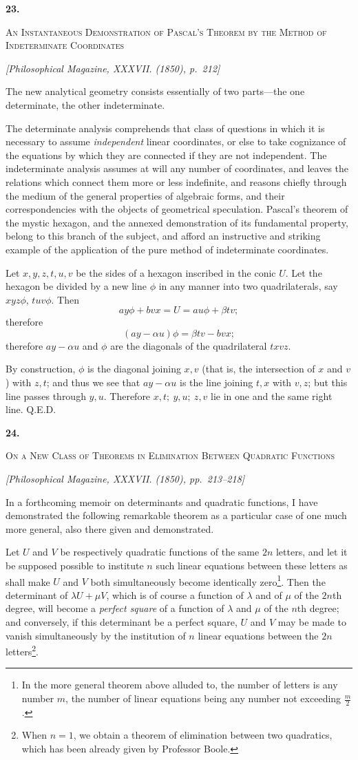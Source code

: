 \documentclass[11pt]{article}
\newcommand{\paperhead}[3]{%
  \clearpage
  \begin{center}
  {\Large\bfseries #1.}\par\vspace{0.85em}
  {\large\scshape #2}\par\vspace{0.6em}
  {\itshape [#3]}\par
  \end{center}\vspace{0.4em}}
\newcommand{\sourcepage}[1]{\marginpar{\scriptsize p.~#1}}
\begin{document}
{{\paperhead{23}{An Instantaneous Demonstration of Pascal's Theorem by the Method of Indeterminate Coordinates}{Philosophical Magazine, XXXVII. (1850), p.~212}

\sourcepage{138}
The new analytical geometry consists essentially of two parts---the one determinate, the other indeterminate.

The determinate analysis comprehends that class of questions in which it is necessary to assume \emph{independent} linear coordinates, or else to take cognizance of the equations by which they are connected if they are not independent. The indeterminate analysis assumes at will any number of coordinates, and leaves the relations which connect them more or less indefinite, and reasons chiefly through the medium of the general properties of algebraic forms, and their correspondencies with the objects of geometrical speculation. Pascal's theorem of the mystic hexagon, and the annexed demonstration of its fundamental property, belong to this branch of the subject, and afford an instructive and striking example of the application of the pure method of indeterminate coordinates.

Let $x,y,z,t,u,v$ be the sides of a hexagon inscribed in the conic $U$. Let the hexagon be divided by a new line $\phi$ in any manner into two quadrilaterals, say $xyz\phi$, $tuv\phi$. Then
\[
ay\phi+bvx=U=a u\phi+\beta t v;
\]
therefore
\[
(ay-\alpha u)\phi=\beta t v-bvx;
\]
therefore $ay-\alpha u$ and $\phi$ are the diagonals of the quadrilateral $txvz$.

By construction, $\phi$ is the diagonal joining $x,v$ (that is, the intersection of $x$ and $v$) with $z,t$; and thus we see that $ay-\alpha u$ is the line joining $t,x$ with $v,z$; but this line passes through $y,u$. Therefore $x,t;\ y,u;\ z,v$ lie in one and the same right line. Q.E.D.

\paperhead{24}{On a New Class of Theorems in Elimination Between Quadratic Functions}{Philosophical Magazine, XXXVII. (1850), pp.~213--218}

\sourcepage{139}
In a forthcoming memoir on determinants and quadratic functions, I have demonstrated the following remarkable theorem as a particular case of one much more general, also there given and demonstrated.

Let $U$ and $V$ be respectively quadratic functions of the same $2n$ letters, and let it be supposed possible to institute $n$ such linear equations between these letters as shall make $U$ and $V$ both simultaneously become identically zero\footnote{In the more general theorem above alluded to, the number of letters is any number $m$, the number of linear equations being any number not exceeding $\frac{m}{2}$.}. Then the determinant of $\lambda U+\mu V$, which is of course a function of $\lambda$ and of $\mu$ of the $2n$th degree, will become a \emph{perfect square} of a function of $\lambda$ and $\mu$ of the $n$th degree; and conversely, if this determinant be a perfect square, $U$ and $V$ may be made to vanish simultaneously by the institution of $n$ linear equations between the $2n$ letters\footnote{When $n=1$, we obtain a theorem of elimination between two quadratics, which has been already given by Professor Boole.}.

}}
\end{document}
